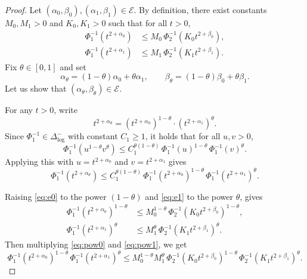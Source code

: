 \documentclass[10pt,a4paper]{amsart}
\begin{document}
\begin{proof}
Let $(\alpha_0, \beta_0), (\alpha_1, \beta_1) \in \mathcal{E}$. By definition,
there exist constants $M_0, M_1 > 0$ and $K_0, K_1 > 0$ such that for all $t > 0$,
\begin{align}
\Phi_1^{-1}\!\left( t^{2+\alpha_0} \right) &\le M_0\,\Phi_2^{-1}\!\left( K_0 t^{2+\beta_0} \right), \label{eq:e0}\\
\Phi_1^{-1}\!\left( t^{2+\alpha_1} \right) &\le M_1\,\Phi_2^{-1}\!\left( K_1 t^{2+\beta_1} \right). \label{eq:e1}
\end{align}
Fix $\theta \in [0,1]$ and set
\[
\alpha_\theta = (1-\theta)\alpha_0 + \theta\alpha_1, \qquad
\beta_\theta = (1-\theta)\beta_0 + \theta\beta_1.
\]
Let us show that $(\alpha_\theta, \beta_\theta) \in \mathcal{E}$.

For any $t > 0$, write
\[
t^{2+\alpha_\theta}
= \left(t^{2+\alpha_0}\right)^{1-\theta}
\cdot \left(t^{2+\alpha_1}\right)^{\theta}.
\]
Since $\Phi_1^{-1}\in\Delta_{\log}^-$ with constant $C_1\ge 1$, it holds that for all $u,v>0$,
\[
\Phi_1^{-1}\!\left(u^{1-\theta}v^{\theta}\right) \le C_1^{\theta(1-\theta)}\,
\Phi_1^{-1}(u)^{1-\theta}\,\Phi_1^{-1}(v)^{\theta}.
\]
Applying this with $u = t^{2+\alpha_0}$ and $v = t^{2+\alpha_1}$ gives
\begin{equation}\label{eq:step1}
\Phi_1^{-1}(t^{2+\alpha_\theta})
\le C_1^{\theta(1-\theta)}\,
\Phi_1^{-1}(t^{2+\alpha_0})^{1-\theta}\,
\Phi_1^{-1}(t^{2+\alpha_1})^{\theta}.
\end{equation}

Raising \eqref{eq:e0} to the power $(1-\theta)$ and \eqref{eq:e1}
to the power $\theta$, gives 
\begin{align}
\Phi_1^{-1}(t^{2+\alpha_0})^{1-\theta}
&\le M_0^{1-\theta}\,\Phi_2^{-1}(K_0 t^{2+\beta_0})^{1-\theta},\label{eq:pow0}\\
\Phi_1^{-1}(t^{2+\alpha_1})^{\theta}
&\le M_1^{\theta}\,\Phi_2^{-1}(K_1 t^{2+\beta_1})^{\theta}.\label{eq:pow1}
\end{align}
Then multiplying \eqref{eq:pow0} and \eqref{eq:pow1}, we get
\begin{equation}\label{eq:step2}
\Phi_1^{-1}(t^{2+\alpha_0})^{1-\theta}\,
\Phi_1^{-1}(t^{2+\alpha_1})^{\theta}
\le M_0^{1-\theta} M_1^{\theta}\,
\Phi_2^{-1}(K_0 t^{2+\beta_0})^{1-\theta}\,
\Phi_2^{-1}(K_1 t^{2+\beta_1})^{\theta}.
\end{equation}


\end{proof}
\end{document}
